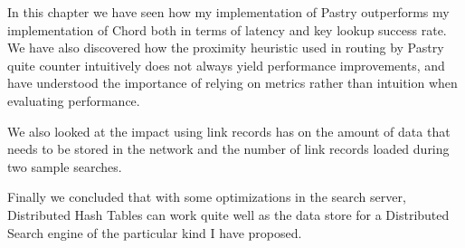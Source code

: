 \mbox{}

In this chapter we have seen how my implementation of Pastry outperforms my implementation of Chord both in terms of latency and key lookup success rate.
We have also discovered how the proximity heuristic used in routing by Pastry quite counter intuitively does not always yield performance improvements, and have understood the importance of relying on metrics rather than intuition when evaluating performance.

We also looked at the impact using link records has on the amount of data that needs to be stored in the network and the number of link records loaded during two sample searches.

Finally we concluded that with some optimizations in the search server, Distributed Hash Tables can work quite well as the data store for a Distributed Search engine of the particular kind I have proposed.
